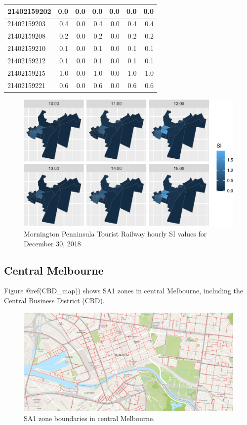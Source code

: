 \documentclass[preprint, 3p,
authoryear]{elsarticle} %
\begin{document}
\begin{table}
\begin{tabular}[t]{l|r|r|r|r|r|r}
\hline
21402159202 & 0.0 & 0.0 & 0.0 & 0.0 & 0.0 & 0.0\\
\hline
21402159203 & 0.4 & 0.0 & 0.4 & 0.0 & 0.4 & 0.4\\
\hline
21402159208 & 0.2 & 0.0 & 0.2 & 0.0 & 0.2 & 0.2\\
\hline
21402159210 & 0.1 & 0.0 & 0.1 & 0.0 & 0.1 & 0.1\\
\hline
21402159212 & 0.1 & 0.0 & 0.1 & 0.0 & 0.1 & 0.1\\
\hline
21402159215 & 1.0 & 0.0 & 1.0 & 0.0 & 1.0 & 1.0\\
\hline
21402159221 & 0.6 & 0.0 & 0.6 & 0.0 & 0.6 & 0.6\\
\hline
\end{tabular}
\end{table}

\begin{figure}
\centering
\includegraphics{Leveraging_GTFS_to_assess_transit_supply_Transport_Geography_files/figure-latex/SI_mornington_20181230_output-1.pdf}
\caption{Mornington Penninsula Tourist Railway hourly SI values for
December 30, 2018}
\end{figure}

\hypertarget{central-melbourne}{%
\subsection{Central Melbourne}\label{central-melbourne}}

Figure @ref(CBD\_map)) shows SA1 zones in central Melbourne, including
the Central Business District (CBD).

\begin{figure}
\includegraphics[width=1\linewidth]{graphics/Melbourne_cbd} \caption{SA1 zone boundaries in central Melbourne.}\label{fig:CBD_map}
\end{figure}
\end{document}
